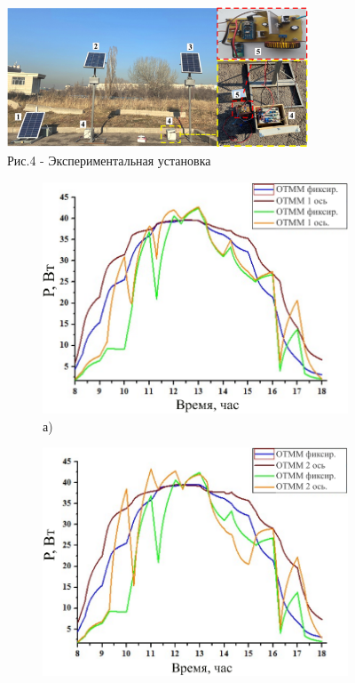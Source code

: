 \begin{figure}[H]
	\centering
	\includegraphics[width=0.8\textwidth]{media/ict/image10}
	\caption*{Рис.4 - Экспериментальная установка}
\end{figure}

\begin{figure}[H]
    \centering
    \begin{subfigure}[b]{0.45\textwidth}
        \centering
        \includegraphics[width=\textwidth]{media/ict/image11}
        \caption*{а)}
    \end{subfigure}
    \hfill
    \begin{subfigure}[b]{0.45\textwidth}
        \centering
        \includegraphics[width=\textwidth]{media/ict/image12}

\end{subfigure}
\end{figure}
